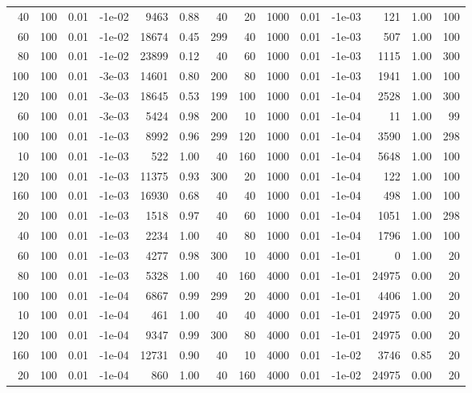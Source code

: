 \begin{table}[ht]
{\begin{tabular}{|rrrrrrr||rrrrrrr|}
  40 & 100 & 0.01 & -1e-02 & 9463 & 0.88 & 40 & 20 & 1000 & 0.01 & -1e-03 & 121 & 1.00 & 100 \\ 
  60 & 100 & 0.01 & -1e-02 & 18674 & 0.45 & 299 & 40 & 1000 & 0.01 & -1e-03 & 507 & 1.00 & 100 \\ 
  80 & 100 & 0.01 & -1e-02 & 23899 & 0.12 & 40 & 60 & 1000 & 0.01 & -1e-03 & 1115 & 1.00 & 300 \\ 
  100 & 100 & 0.01 & -3e-03 & 14601 & 0.80 & 200 & 80 & 1000 & 0.01 & -1e-03 & 1941 & 1.00 & 100 \\ 
  120 & 100 & 0.01 & -3e-03 & 18645 & 0.53 & 199 & 100 & 1000 & 0.01 & -1e-04 & 2528 & 1.00 & 300 \\ 
  60 & 100 & 0.01 & -3e-03 & 5424 & 0.98 & 200 & 10 & 1000 & 0.01 & -1e-04 & 11 & 1.00 & 99 \\ 
  100 & 100 & 0.01 & -1e-03 & 8992 & 0.96 & 299 & 120 & 1000 & 0.01 & -1e-04 & 3590 & 1.00 & 298 \\ 
  10 & 100 & 0.01 & -1e-03 & 522 & 1.00 & 40 & 160 & 1000 & 0.01 & -1e-04 & 5648 & 1.00 & 100 \\ 
  120 & 100 & 0.01 & -1e-03 & 11375 & 0.93 & 300 & 20 & 1000 & 0.01 & -1e-04 & 122 & 1.00 & 100 \\ 
  160 & 100 & 0.01 & -1e-03 & 16930 & 0.68 & 40 & 40 & 1000 & 0.01 & -1e-04 & 498 & 1.00 & 100 \\ 
  20 & 100 & 0.01 & -1e-03 & 1518 & 0.97 & 40 & 60 & 1000 & 0.01 & -1e-04 & 1051 & 1.00 & 298 \\ 
  40 & 100 & 0.01 & -1e-03 & 2234 & 1.00 & 40 & 80 & 1000 & 0.01 & -1e-04 & 1796 & 1.00 & 100 \\ 
  60 & 100 & 0.01 & -1e-03 & 4277 & 0.98 & 300 & 10 & 4000 & 0.01 & -1e-01 & 0 & 1.00 & 20 \\ 
  80 & 100 & 0.01 & -1e-03 & 5328 & 1.00 & 40 & 160 & 4000 & 0.01 & -1e-01 & 24975 & 0.00 & 20 \\ 
  100 & 100 & 0.01 & -1e-04 & 6867 & 0.99 & 299 & 20 & 4000 & 0.01 & -1e-01 & 4406 & 1.00 & 20 \\ 
  10 & 100 & 0.01 & -1e-04 & 461 & 1.00 & 40 & 40 & 4000 & 0.01 & -1e-01 & 24975 & 0.00 & 20 \\ 
  120 & 100 & 0.01 & -1e-04 & 9347 & 0.99 & 300 & 80 & 4000 & 0.01 & -1e-01 & 24975 & 0.00 & 20 \\ 
  160 & 100 & 0.01 & -1e-04 & 12731 & 0.90 & 40 & 10 & 4000 & 0.01 & -1e-02 & 3746 & 0.85 & 20 \\ 
  20 & 100 & 0.01 & -1e-04 & 860 & 1.00 & 40 & 160 & 4000 & 0.01 & -1e-02 & 24975 & 0.00 & 20 \\ 

\end{tabular}}
\end{table}
